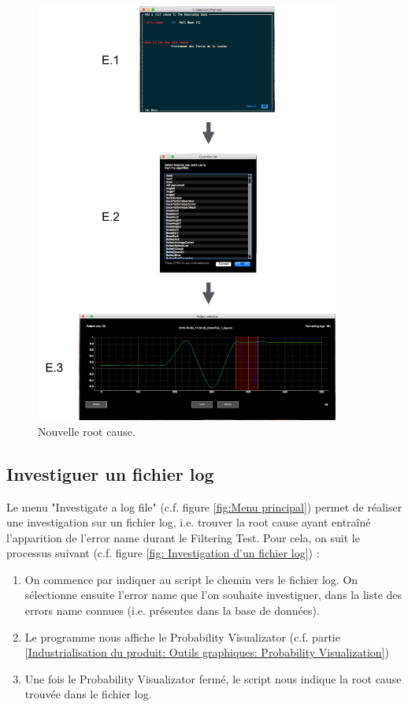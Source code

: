 \begin{figure}[H]
	\centering\includegraphics[width=10cm]{images/add_root_menu.png}
	\caption[Nouvelle root cause]{Nouvelle root cause.}
	\label{fig: Nouvelle root cause}
\end{figure} 


\subsection{Investiguer un fichier log}
\label{Industrialisation du produit: Utilisation suggérée des outils: Investiguer}
Le menu "Investigate a log file" (c.f. figure \ref{fig:Menu principal}) permet de réaliser une investigation sur un fichier log, i.e. trouver la root cause ayant entraîné l'apparition de l'error name durant le Filtering Test. Pour cela, on suit le processus suivant (c.f. figure \ref{fig: Investigation d'un fichier log}) : 
\begin{enumerate}
	\item On commence par indiquer au script le chemin vers le fichier log. On sélectionne ensuite l'error name que l'on souhaite investiguer, dans la liste des errors name connues (i.e. présentes dans la base de données).
	\item Le programme nous affiche le Probability Visualizator (c.f. partie \ref{Industrialisation du produit: Outils graphiques: Probability Visualization})
	\item Une fois le Probability Visualizator fermé, le script nous indique la root cause trouvée dans le fichier log. 
\end{enumerate}

